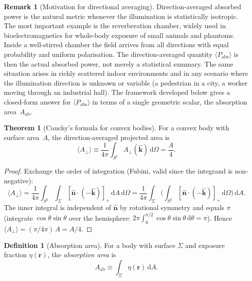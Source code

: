 \documentclass[11pt,a4paper]{article}
\theoremstyle{definition}      %
\newtheorem{theorem}{Theorem}[section]
\newtheorem{definition}[definition]{Definition}
\newtheorem{remark}[remark]{Remark}
\newcommand{\khat}{\hat{\bm{k}}}
\newcommand{\nhat}{\hat{\bm{n}}}
\newcommand{\rr}{\mathbf{r}}
\newcommand{\Aab}{A_{\mathrm{ab}}}
\newcommand{\Aperp}{A_{\perp}}
\newcommand{\diff}{\mathrm{d}}        %
\begin{document}
\begin{remark}[Motivation for directional averaging]
Direction-averaged absorbed power is the natural metric whenever the
illumination is statistically isotropic.  The most important example
is the reverberation chamber, widely used in bioelectromagnetics
for whole-body exposure of small animals and phantoms.  Inside a
well-stirred chamber the field arrives from all directions with equal
probability and uniform polarisation.  The direction-averaged quantity
$\langle P_{\mathrm{abs}}\rangle$ is then the actual absorbed power,
not merely a statistical summary.  The same situation arises in richly
scattered indoor environments and in any scenario where the
illumination direction is unknown or variable (a pedestrian in a city,
a worker moving through an industrial hall).  The framework developed
below gives a closed-form answer for
$\langle P_{\mathrm{abs}}\rangle$ in terms of a single geometric
scalar, the absorption area~$\Aab$.
\end{remark}

\begin{theorem}[Cauchy's formula for convex bodies]
For a convex body with surface area~$A$, the direction-averaged
projected area is
\begin{equation}\label{eq:cauchy}
  \langle \Aperp\rangle
  \equiv \frac{1}{4\pi}\int_{S^2}\Aperp(\khat)\,\diff\Omega
  = \frac{A}{4}.
\end{equation}
\end{theorem}

\begin{proof}
Exchange the order of integration (Fubini, valid since the integrand
is non-negative):
\[
  \langle\Aperp\rangle
  = \frac{1}{4\pi}\int_{S^2}\int_\Sigma[\nhat\cdot(-\khat)]_+\,\diff A\,\diff\Omega
  = \frac{1}{4\pi}\int_\Sigma
    \biggl(\int_{S^2}[\nhat\cdot(-\khat)]_+\,\diff\Omega\biggr)\,\diff A.
\]
The inner integral is independent of $\nhat$ by rotational symmetry
and equals $\pi$ (integrate $\cos\theta\sin\theta$ over the
hemisphere: $2\pi\int_0^{\pi/2}\cos\theta\sin\theta\,\diff\theta=\pi$).
Hence $\langle\Aperp\rangle = (\pi/4\pi)\,A = A/4$.
\end{proof}

\begin{definition}[Absorption area]\label{def:Aab}
For a body with surface $\Sigma$ and exposure fraction
$\eta(\rr)$, the \emph{absorption area} is
\begin{equation}\label{eq:Aab-def}
  \Aab \equiv \int_\Sigma\eta(\rr)\,\diff A.
\end{equation}
\end{definition}
\end{document}
